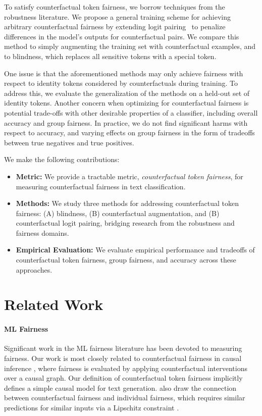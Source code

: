 \documentclass[letterpaper]{article} %
\theoremstyle{definition}
\begin{document}
To satisfy counterfactual token fairness, we borrow techniques from the robustness literature. We propose a general training scheme for achieving arbitrary counterfactual fairness by extending logit pairing~\cite{ALP} to penalize differences in the model's outputs for counterfactual pairs. We compare this method to simply augmenting the training set with counterfactual examples, and to blindness, which replaces all sensitive tokens with a special token. 

One issue is that the aforementioned methods may only achieve fairness with respect to identity tokens considered by counterfactuals during training. To address this, we evaluate the generalization of the methods on a held-out set of identity tokens.
Another concern when optimizing for counterfactual fairness is potential trade-offs with other desirable properties of a classifier, including overall accuracy and group fairness. In practice, we do not find significant harms with respect to accuracy, and varying effects on group fairness in the form of tradeoffs between true negatives and true positives. 

We make the following contributions:
\begin{itemize}
    \item \textbf{Metric:} We provide a tractable metric, \emph{counterfactual token fairness}, for measuring counterfactual fairness in text classification.
    \item \textbf{Methods:} We study three methods for addressing counterfactual token fairness: (A) blindness, (B) counterfactual augmentation, and (B) counterfactual logit pairing, bridging research from the robustness and fairness domains.
    \item \textbf{Empirical Evaluation:} We evaluate empirical performance and tradeoffs of counterfactual token fairness, group fairness, and accuracy across these approaches.
\end{itemize}



\section{Related Work} \label{related}

\paragraph{ML Fairness} Significant work in the ML fairness literature has been devoted to measuring fairness. Our work is most closely related to counterfactual fairness in causal inference \cite{Kusner17,Kilbertus17}, where fairness is evaluated by applying counterfactual interventions over a causal graph. Our definition of counterfactual token fairness implicitly defines a simple causal model for text generation. \citeauthor{Kusner17} also draw the connection between counterfactual fairness and individual fairness, which requires similar predictions for similar inputs via a Lipschitz constraint  \cite{Dwork11}.  
\end{document}
